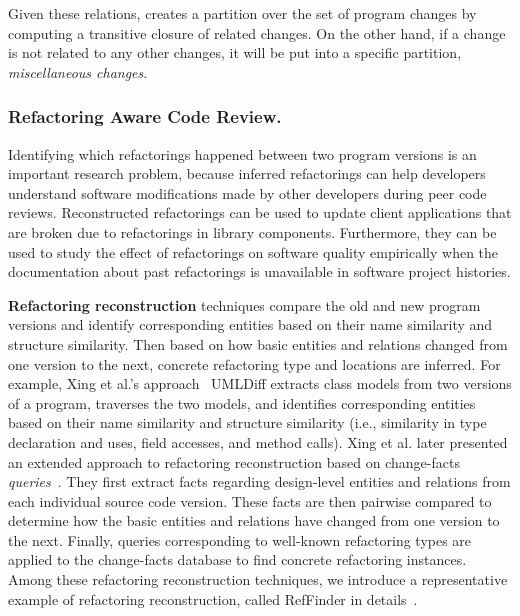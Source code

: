 Given these relations, {\clusterchanges} creates a partition over the set of program changes by computing a transitive closure of related changes. On the other hand, if a change is not related to any other changes, it will be put into a specific partition, {\em miscellaneous changes}.


\subsubsection{Refactoring Aware Code Review.}  
\label{sec:refactoringreview} 

Identifying which refactorings happened between two program versions is an important research problem, because inferred refactorings can help developers understand software modifications made by other developers during peer code reviews. Reconstructed refactorings can be used to update client applications that are broken due to refactorings in library components. Furthermore, they can be used to study the effect of refactorings on software quality empirically when the documentation about past refactorings is unavailable in software project histories. 

{\bf Refactoring reconstruction} techniques compare the old and new program versions and identify corresponding entities based on their {name similarity} and {structure similarity}\cite{Demeyer2000, Zou2005, Malpohl2000, Dig2006, Weissgerber2006}. Then based on how basic entities and relations changed from one version to the next, concrete refactoring type and locations are inferred. For example, Xing et al.'s approach~\cite{UMLDiff2005} UMLDiff extracts class models from two versions of a program, traverses the two models, and identifies corresponding entities based on their {name similarity} and {structure similarity} {(i.e., similarity in type declaration and uses, field accesses, and method calls)}. Xing {et al.} later presented an extended approach to refactoring reconstruction based on change-facts {\em queries}~\cite{Eleni01}. They first extract facts regarding design-level entities and relations from each individual source code version. These facts are then pairwise compared to determine how the basic entities and relations have changed from one version to the next. Finally, queries corresponding to well-known refactoring types are applied to the change-facts database to find concrete refactoring instances. Among these refactoring reconstruction techniques, we introduce a representative example of refactoring reconstruction, called RefFinder in details~\cite{Prete2010:reffinder,Kim2010:reffinder}.   

